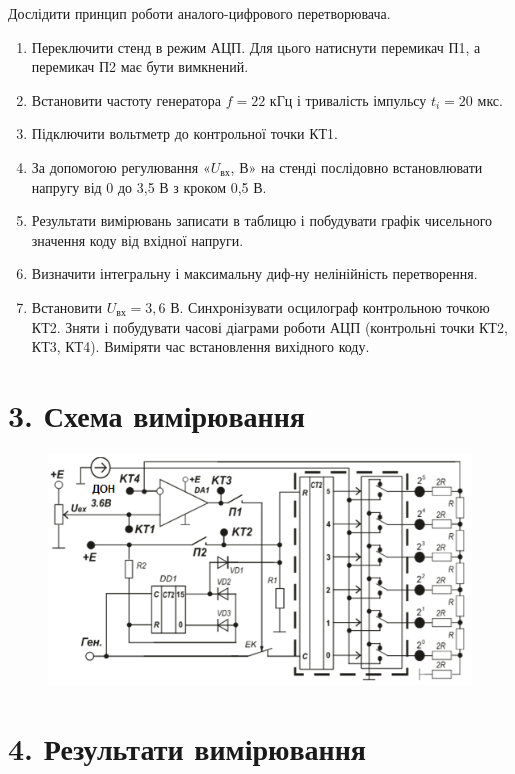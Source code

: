 \documentclass[14pt]{extreport}
\begin{document}
 Дослідити принцип роботи аналого-цифрового перетворювача.

\begin{enumerate}

\item Переключити стенд в режим АЦП. Для цього натиснути перемикач П1, а перемикач П2 має бути вимкнений.
\item Встановити частоту генератора $f = 22$ кГц і тривалість імпульсу $t_i = 20$ мкс.
\item Підключити вольтметр до контрольної точки КТ1.
\item За допомогою регулювання «$U_{\text{вх}}$, В» на стенді послідовно встановлювати напругу від 0 до 3,5 В з кроком 0,5 В.
\item Результати вимірювань записати в таблицю і побудувати графік чисельного значення коду від вхідної напруги.
\item Визначити інтегральну і максимальну диф-ну нелінійність перетворення.
\item Встановити $U_{\text{вх}} = 3,6$ В. Синхронізувати осцилограф контрольною
точкою КТ2. Зняти і побудувати часові діаграми роботи АЦП (контрольні
точки КТ2, КТ3, КТ4). Виміряти час встановлення вихідного коду.

\end{enumerate}




\section*{\textrm{3. Схема вимірювання}}


\begin{figure}[h!]
  \includegraphics[width=0.55\linewidth]{adc_dac.png}
\end{figure}

\newpage
\section*{\textrm{4. Результати вимірювання}}
\end{document}
